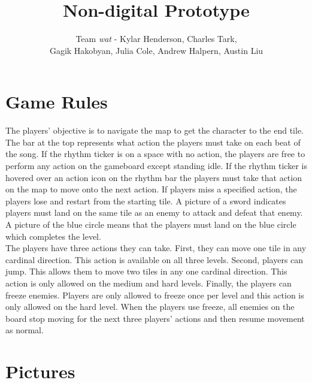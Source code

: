 \documentclass[]{article}
\begin{document}
\title{Non-digital Prototype}
\author{Team \emph{wat} - Kylar Henderson, Charles Tark,\\ 
Gagik Hakobyan, Julia Cole, Andrew Halpern, Austin Liu}
\date{} %
\maketitle

\section*{Game Rules}

The players' objective is to navigate the map to get the character to
the end tile. The bar at the top represents what action the players
must take on each beat of the song. If the rhythm ticker is on a space
with no action, the players are free to perform any action on the
gameboard except standing idle. If the rhythm ticker is hovered over
an action icon on the rhythm bar the players must take that action on
the map to move onto the next action. If players miss a specified
action, the players lose and restart from the starting tile. A picture
of a sword indicates players must land on the same tile as an enemy to
attack and defeat that enemy. A picture of the blue circle means that
the players must land on the blue circle which completes the level.\\

The players have three actions they can take. First, they can move one
tile in any cardinal direction. This action is available on all three
levels. Second, players can jump. This allows them to move two tiles
in any one cardinal direction. This action is only allowed on the
medium and hard levels. Finally, the players can freeze
enemies. Players are only allowed to freeze once per level and this
action is only allowed on the hard level. When the players use freeze,
all enemies on the board stop moving for the next three players'
actions and then resume movement as normal.

\pagebreak
\section*{Pictures}
\end{document}

